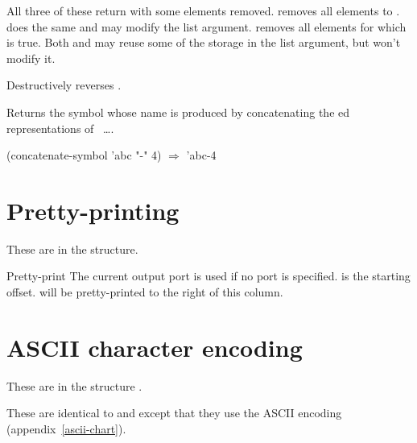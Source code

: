 \begin{protos}
\end{protos}
All three of these return  with some elements removed.
 removes all elements  to .  
does the same and may modify the list argument.   removes
all elements for which  is true.  Both  and
 may reuse some of the storage in the list argument, but
won't modify it.

\begin{protos}
\end{protos}
Destructively reverses .

\begin{protos}
\end{protos}
Returns the symbol whose name is produced by concatenating the
ed
representations of ~\ldots.

\begin{example}
(concatenate-symbol 'abc "-" 4) \(\Longrightarrow\) 'abc-4
\end{example}

\section{Pretty-printing}

These are in the  structure.

\begin{protos}
\end{protos}
Pretty-print  The current output port is used if no port is
specified.   is the starting offset.   will be
pretty-printed to the right of this column.

\section{ASCII character encoding}
\label{ascii-procedures}

These are in the structure .

\begin{protos}
\end{protos}
\noindent
These are identical to  and  except that
 they use the
ASCII encoding (appendix~\ref{ascii-chart}).


